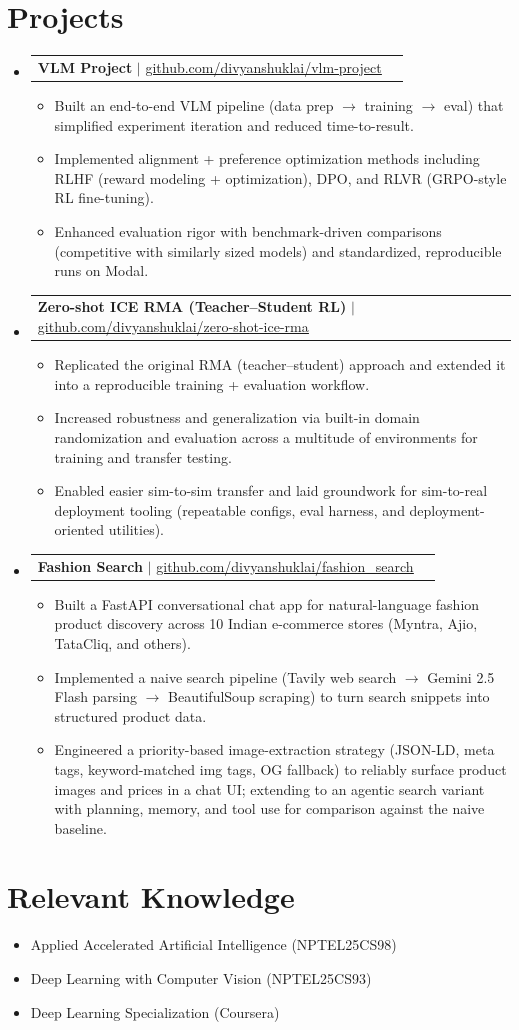 \documentclass[letterpaper,11pt]{article}
\makeatletter
\newcommand{\resumeItem}[1]{
  \item\small{
    {#1 \vspace{-2pt}}
  }
}
\newcommand{\resumeProjectHeading}[2]{
    \item
    \begin{tabular*}{0.97\textwidth}{l@{\extracolsep{\fill}}r}
      \small#1 & #2 \\
    \end{tabular*}\vspace{-4pt}
}
\newcommand{\resumeSubHeadingListStart}{\begin{itemize}[leftmargin=0.15in, label={}, itemsep=2pt]}
\newcommand{\resumeSubHeadingListEnd}{\end{itemize}\vspace{-5pt}}
\newcommand{\resumeItemListStart}{\begin{itemize}[itemsep=0pt]}
\newcommand{\resumeItemListEnd}{\end{itemize}\vspace{0pt}}
\makeatother
\begin{document}
\section{Projects}
    \resumeSubHeadingListStart
      \resumeProjectHeading
          {\textbf{VLM Project} $|$ \href{https://github.com/divyanshuklai/vlm-project}{\underline{github.com/divyanshuklai/vlm-project}}}{}
          \resumeItemListStart
            \resumeItem{Built an end-to-end VLM pipeline (data prep $\rightarrow$ training $\rightarrow$ eval) that simplified experiment iteration and reduced time-to-result.}
            \resumeItem{Implemented alignment + preference optimization methods including RLHF (reward modeling + optimization), DPO, and RLVR (GRPO-style RL fine-tuning).}
            \resumeItem{Enhanced evaluation rigor with benchmark-driven comparisons (competitive with similarly sized models) and standardized, reproducible runs on Modal.}
          \resumeItemListEnd

      \resumeProjectHeading
          {\textbf{Zero-shot ICE RMA (Teacher--Student RL)} $|$ \href{https://github.com/divyanshuklai/zero-shot-ice-rma}{\underline{github.com/divyanshuklai/zero-shot-ice-rma}}}{}
          \resumeItemListStart
            \resumeItem{Replicated the original RMA (teacher--student) approach and extended it into a reproducible training + evaluation workflow.}
            \resumeItem{Increased robustness and generalization via built-in domain randomization and evaluation across a multitude of environments for training and transfer testing.}
            \resumeItem{Enabled easier sim-to-sim transfer and laid groundwork for sim-to-real deployment tooling (repeatable configs, eval harness, and deployment-oriented utilities).}
          \resumeItemListEnd

      \resumeProjectHeading
          {\textbf{Fashion Search} $|$ \href{https://github.com/divyanshuklai/fashion_search}{\underline{github.com/divyanshuklai/fashion\_search}}}{}
          \resumeItemListStart
            \resumeItem{Built a FastAPI conversational chat app for natural-language fashion product discovery across 10 Indian e-commerce stores (Myntra, Ajio, TataCliq, and others).}
            \resumeItem{Implemented a naive search pipeline (Tavily web search $\rightarrow$ Gemini 2.5 Flash parsing $\rightarrow$ BeautifulSoup scraping) to turn search snippets into structured product data.}
            \resumeItem{Engineered a priority-based image-extraction strategy (JSON-LD, meta tags, keyword-matched img tags, OG fallback) to reliably surface product images and prices in a chat UI; extending to an agentic search variant with planning, memory, and tool use for comparison against the naive baseline.}
          \resumeItemListEnd
    \resumeSubHeadingListEnd

\section{Relevant Knowledge}
  \resumeSubHeadingListStart
    \resumeItem{Applied Accelerated Artificial Intelligence (NPTEL25CS98)}
    \resumeItem{Deep Learning with Computer Vision (NPTEL25CS93)}
    \resumeItem{Deep Learning Specialization (Coursera)}
  \resumeSubHeadingListEnd
\end{document}
